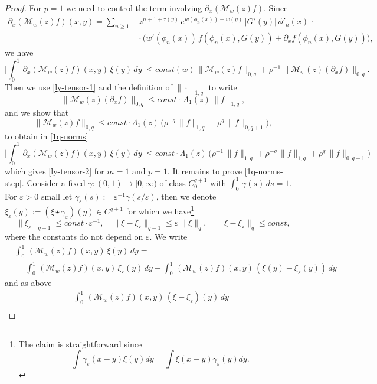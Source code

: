 \documentclass[11pt]{amsart}
\theoremstyle{definition}
\theoremstyle{remark}
\theoremstyle{definition}
\numberwithin{equation}{section}
\newcommand{\eps}{\varepsilon}
\newcommand{\MM}{\mathcal{M}}
\begin{document}
\begin{proof}
For $p=1$ we need to control the term involving $\partial_x (\MM_w(z)f)$. Since
\[
\begin{aligned}
\partial_x (\MM_w(z)f)(x,y) = \sum_{n\ge 1}\, & z^{n+1+\tau(y)}\, e^{w(\phi_n(x))+w(y)}\, |G'(y)|\, \phi'_n(x)\, \cdot \\[0.2cm]
&\cdot \, \Big( w'(\phi_n(x))\, f(\phi_n(x),G(y)) + \partial_x f (\phi_n(x),G(y))\Big),
\end{aligned}
\]
we have
\begin{equation}\label{1q-norms}
\Big| \int_0^1\, \partial_x (\MM_w(z)f)(x,y)\, \xi(y)\, dy\Big| \le const(w)\, \|\MM_w(z)f\|_{0,q} + \rho^{-1}\, \|\MM_w(z) (\partial_x f)\|_{0,q}.
\end{equation}
Then we use \eqref{ly-tensor-1} and the definition of $\|\cdot\|_{1,q}$ to write
\[
\|\MM_w(z) (\partial_x f)\|_{0,q} \le const\cdot\, \Lambda_1(z)\, \|f\|_{1,q},
\]
and we show that
\begin{equation}\label{1q-norms-step}
\|\MM_w(z)f\|_{0,q} \le const\cdot  \Lambda_1(z)\, \Big(\rho^{-q}\, \|f\|_{1,q} + \rho^{q}\, \|f\|_{0,q+1}\Big),
\end{equation}
to obtain in \eqref{1q-norms}
\[
\Big| \int_0^1\, \partial_x (\MM_w(z)f)(x,y)\, \xi(y)\, dy\Big| \le const\cdot  \Lambda_1(z)\, \Big(\rho^{-1}\,  \|f\|_{1,q} + \rho^{-q}\, \|f\|_{1,q} + \rho^{q}\, \|f\|_{0,q+1}\Big)
\]
which gives \eqref{ly-tensor-2} for $m=1$ and $p=1$. It remains to prove \eqref{1q-norms-step}. Consider a fixed $\gamma:(0,1)\to [0,\infty)$ of class $C_0^{q+1}$ with $\int_0^1\, \gamma(s) \, ds =1$. For $\eps>0$ small let $\gamma_\eps(s) := \eps^{-1} \gamma(s/\eps)$, then we denote $\xi_\eps(y) := (\xi \star \gamma_\eps) (y) \in C^{q+1}$ for which we have\footnote{The claim is straightforward since 
\[
\int \gamma_\varepsilon (x-y) \xi(y) dy= \int \xi(x-y)\gamma_\varepsilon (y) dy.
\]}
\begin{equation} \label{mollifiers}
\| \xi_\eps \|_{q+1} \le const\cdot \eps^{-1}, \quad \| \xi-\xi_\eps\|_{q-1}\le \eps\, \|\xi\|_q, \quad \| \xi-\xi_\eps\|_{q}\le const,
\end{equation}
where the constants do not depend on $\eps$. We write
\[
\begin{split}
&\int_0^1\, (\MM_w(z) f)(x,y)\, \xi(y)\, dy= \\
&= \int_0^1\, (\MM_w(z) f)(x,y)\, \xi_\eps(y)\, dy + \int_0^1\, (\MM_w(z) f)(x,y)\, (\xi(y)-\xi_\eps(y))\, dy
\end{split}
\]
and as above
\[
\begin{split}
&\int_0^1\, (\MM_w(z) f)(x,y)\, (\xi-\xi_\eps)(y)\, dy= \\

\end{split}\]
\end{proof}
\end{document}
